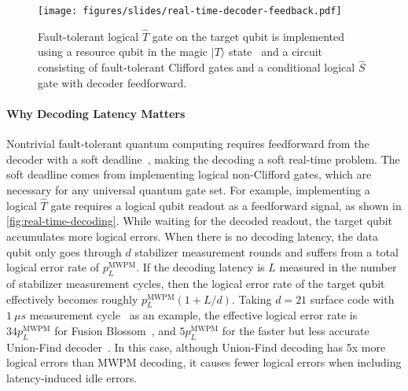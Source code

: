 \begin{figure}[!t]
    \centering
    \texttt{[image: figures/slides/real-time-decoder-feedback.pdf]}
    \caption{Fault-tolerant logical $\hat{T}$ gate on the target qubit is implemented using a resource qubit in the magic $|T\rangle$ state~\cite{bravyi2005universal} and a circuit consisting of fault-tolerant Clifford gates and a conditional logical $\hat{S}$ gate with decoder feedforward.}
    \label{fig:real-time-decoding}
\end{figure}

\paragraph{Why Decoding Latency Matters}
Nontrivial fault-tolerant quantum computing requires feedforward from the decoder with a soft deadline~\cite{terhal2015quantum}, making the decoding a soft real-time problem.
The soft deadline comes from implementing logical non-Clifford gates, which are necessary for any universal quantum gate set.
For example, implementing a logical $\hat{T}$ gate requires a logical qubit readout as a feedforward signal, as shown in \autoref{fig:real-time-decoding}.
While waiting for the decoded readout, the target qubit accumulates more logical errors.
When there is no decoding latency, the data qubit only goes through $d$ stabilizer measurement rounds and suffers from a total logical error rate of $p^\text{MWPM}_L$.
If the decoding latency is $L$ measured in the number of stabilizer measurement cycles, then the logical error rate of the target qubit effectively becomes roughly $p^\text{MWPM}_L (1 + L/d)$.
Taking $d=21$ surface code with $\qty{1}{\mu s}$ measurement cycle~\cite{google2023suppressing} as an example, the effective logical error rate is $34 p^\text{MWPM}_L$ for Fusion Blossom~\cite{wu2023qce}, and $5 p^\text{MWPM}_L$ for the faster but less accurate Union-Find decoder~\cite{liyanage2024fpga}.
In this case, although Union-Find decoding has 5x more logical errors than MWPM decoding, it causes fewer logical errors when including latency-induced idle errors.
